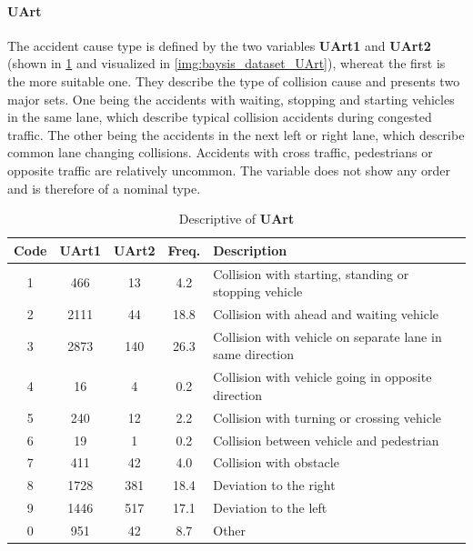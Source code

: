 \paragraph{UArt}
\label{baysis_dataset_UArt}
The accident cause type is defined by the two variables \textbf{UArt1} and \textbf{UArt2} (shown in \cref{tbl:baysis_dataset_UArt} and visualized in \cref{img:baysis_dataset_UArt}), whereat the first is the more suitable one. They describe the type of collision cause and presents two major sets. One being the accidents with waiting, stopping and starting vehicles in the same lane, which describe typical collision accidents during congested traffic. The other being the accidents in the next left or right lane, which describe common lane changing collisions. Accidents with cross traffic, pedestrians or opposite traffic are relatively uncommon. The variable does not show any order and is therefore of a nominal type.
\begin{table}[ht]
	\centering
	\small
	\begin{tabular}{c|c|c|c|l} 
		\toprule
		Code & \textbf{UArt1} & \textbf{UArt2} & Freq. & Description \\ 
		\midrule
 		1 & 466		& 13	& 4.2  & Collision with starting, standing or stopping vehicle  \\ 
 		2 & 2111	& 44 	& 18.8 & Collision with ahead and waiting vehicle  \\
 		3 & 2873	& 140	& 26.3 & Collision with vehicle on separate lane in same direction  \\
 		4 &	16		& 4		& 0.2   & Collision with vehicle going in opposite direction  \\
 		5 & 240		& 12	& 2.2  & Collision with turning or crossing vehicle  \\
 		6 & 19		& 1		& 0.2   & Collision between vehicle and pedestrian  \\
 		7 & 411		& 42	& 4.0  & Collision with obstacle  \\
 		8 & 1728	& 381	& 18.4 & Deviation to the right  \\
 		9 & 1446	& 517	& 17.1 & Deviation to the left  \\
		0 & 951		& 42	& 8.7  & Other  \\
		\bottomrule
	\end{tabular}
	\caption{Descriptive of \textbf{UArt}}
	\label{tbl:baysis_dataset_UArt}
\end{table}
